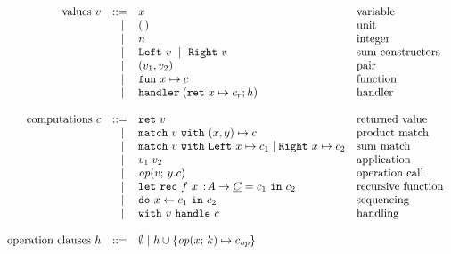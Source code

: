 
\[
	\begin{array}{rrll}
		\text{values}~v
		 & ::=   & x                      			& \text{variable}          \\
		 & \vsep & \unit												& \text{unit}							 \\
		 & \vsep & n														& \text{integer}					 \\
		 & \vsep & \inleft{v}~\vsep~\inright{v} & \text{sum constructors}  \\
		 & \vsep & \pair{v_1}{v_2}							&	\text{pair}						 	 \\
		 & \vsep & \fun{x}{c}             			& \text{function}          \\
		 & \vsep & \handler{h}      						& \text{handler}           \\
		 \\
		 \text{computations}~c
		 & ::=   & \return{v}             		& \text{returned value}    				\\
		 & \vsep & \match{v} \pair{x}{y} \mapsto c 	 		& \text{product match} 	\\
		 & \vsep & \match{v} \sumcases{x}{c_1}{x}{c_2} 	& \text{sum match} 			\\
		 & \vsep & \apply{v_1}{v_2}       		& \text{application}       				\\
		 & \vsep & \operation{v}{y.c}     		& \text{operation call}    				\\
		 & \vsep & \letrec{f}{x}{\tyA \to \ctyC}{c_1} {c_2}		& \text{recursive function} 			\\
		 & \vsep & \dobind{x}{c_1}{c_2}   		& \text{sequencing}        				\\
		 & \vsep & \withhandle{v}{c}      		& \text{handling}					 				\\
		 \\
		 \text{operation clauses}~h
			& ::=   & \emptyhcases 
			\vsep 		h \union \set{\operation{x}{k} \mapsto c_{\op}} 	\\
		\end{array}
		\]
